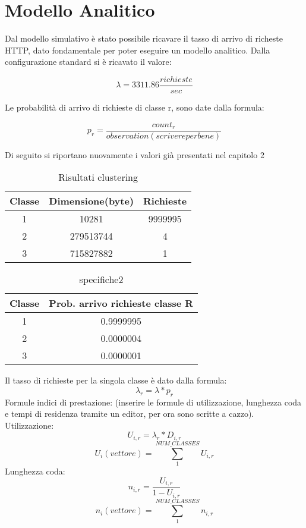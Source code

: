 \chapter{Modello Analitico}
Dal modello simulativo è stato possibile ricavare il tasso di arrivo di richeste HTTP, dato fondamentale per poter eseguire un modello analitico. Dalla configurazione standard si è ricavato il valore: 

$$\lambda =  3311.86 \frac{richieste}{sec}$$

Le probabilità di arrivo di richieste di classe r, sono date dalla formula:

$$p_{r} = \frac{count_{r}}{observation (scrivere per bene)}$$

Di seguito si riportano nuovamente i valori già presentati nel capitolo 2
\begin{table}[htbp]
\begin{center}
\begin{tabular}{||c|c|c||}
\hline
Classe	&Dimensione(byte)		&Richieste \\ 
\hline\hline
1 &10281 &9999995\\ \hline
2 &279513744 &4 \\ \hline
3 &715827882 &1 \\ \hline
\end{tabular}
\end{center}
\caption{Risultati clustering}
\label{risclustering}
\end{table}
\begin{table}[H]
\begin{center}
\begin{tabular}{||c|c||}
\hline
Classe		&Prob. arrivo richieste classe R	\\
\hline
\hline
1		&0.9999995	\\
\hline
2		&0.0000004\\
\hline
3		&0.0000001\\
\hline
\end{tabular}
\end{center}
\caption{specifiche2}
\label{test_2}
\end{table}
Il tasso di richieste per la singola classe è dato dalla formula: 
$$
\lambda_{r} = \lambda*p_{r}
$$
Formule indici di prestazione:
(inserire le formule di utilizzazione, lunghezza coda e tempi di residenza tramite un editor, per ora sono scritte a cazzo).
Utilizzazione:
$$U_{i,r} = \lambda_{r} * D_{i,r}$$
$$U_{i} (vettore)  = \sum_{1}^{NUM\_CLASSES} U_{i,r}$$
Lunghezza coda:
$$n_{i,r} = \frac{U_{i,r}}{1 - U_{i,r}}$$
$$n_{i} (vettore) = \sum_{1}^{NUM\_CLASSES} n_{i,r}$$
